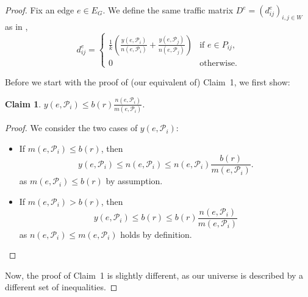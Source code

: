 \documentclass[11pt]{article}
\theoremstyle{definition}
\newtheorem{claim}{Claim}
\begin{document}
    \begin{proof}
        Fix an edge $e \in E_G$.
        We define the same traffic matrix $D^e = (d^e_{ij})_{i,j \in W}$ as in \cite{grandoni2008short},
        \[
            d^e_{ij} = \begin{cases}
                           \frac 1 k \left( \frac{y(e, \mathcal P_i)}{n(e, \mathcal P_i)} + \frac{y(e, \mathcal P_j)}{n(e, \mathcal P_j)} \right) & \text{if $e \in P_{ij}$,} \\
                           0 & \text{otherwise.}
            \end{cases}
        \]

        Before we start with the proof of (our equivalent of) Claim~1, we first show:

        \renewcommand\theclaim{0}
        \begin{claim}
            $y(e, \mathcal P_i) \le b(r) \frac{n(e, \mathcal P_i)}{m(e, \mathcal P_i)}$.
        \end{claim}
        \begin{proof}
            We consider the two cases of $y(e, \mathcal P_i)$:
            \begin{itemize}
                \item If $m(e, \mathcal P_i) \le b(r)$, then
                \[
                    y(e, \mathcal P_i) \le n(e, \mathcal P_i) \le n(e, \mathcal P_i) \frac{b(r)}{m(e, \mathcal P_i)}.
                \]
                as $m(e, \mathcal P_i) \le b(r)$ by assumption.
                \item If $m(e, \mathcal P_i) > b(r)$, then
                \[
                    y(e, \mathcal P_i) \le b(r) \le b(r) \frac{n(e, \mathcal P_i)}{m(e, \mathcal P_i)}
                \]
                as $n(e, \mathcal P_i) \le m(e, \mathcal P_i)$ holds by definition.\qedhere
            \end{itemize}
        \end{proof}

        Now, the proof of Claim~1 is slightly different, as our universe is described by a different set of inequalities.


\end{proof}
\end{document}
